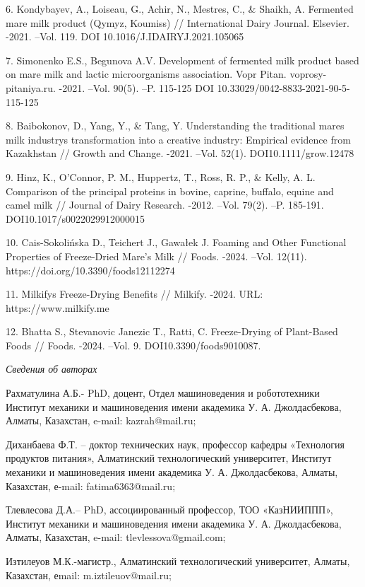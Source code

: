 6. Kondybayev, A., Loiseau, G., Achir, N., Mestres, C., \& Shaikh, A.
Fermented mare milk product (Qymyz, Koumiss) // International Dairy
Journal. Elsevier. -2021. --Vol. 119. DOI 10.1016/J.IDAIRYJ.2021.105065

7. Simonenko E.S., Begunova A.V. Development of fermented milk product
based on mare milk and lactic microorganisms association. Vopr Pitan.
voprosy-pitaniya.ru. -2021. --Vol. 90(5). --P. 115-125 DOI
10.33029/0042-8833-2021-90-5-115-125

8. Baibokonov, D., Yang, Y., \& Tang, Y. Understanding the traditional
mares\textquotesingle{} milk industry\textquotesingle s transformation
into a creative industry: Empirical evidence from Kazakhstan // Growth
and Change. -2021. --Vol. 52(1). DOI10.1111/grow.12478

9. Hinz, K., O'Connor, P. M., Huppertz, T., Ross, R. P., \& Kelly, A. L.
Comparison of the principal proteins in bovine, caprine, buffalo, equine
and camel milk // Journal of Dairy Research. -2012. --Vol. 79(2). --P.
185-191. DOI10.1017/s0022029912000015

10. Cais-Sokolińska D., Teichert J., Gawałek J. Foaming and Other
Functional Properties of Freeze-Dried Mare's Milk // Foods. -2024.
--Vol. 12(11). https://doi.org/10.3390/foods12112274

11. Milkify\textquotesingle s Freeze-Drying Benefits // Milkify. -2024.
URL: https://www.milkify.me

12. Bhatta S., Stevanovic Janezic T., Ratti, C. Freeze-Drying of
Plant-Based Foods // Foods. -2024. --Vol. 9. DOI10.3390/foods9010087.

\emph{Сведения об авторах}

Рахматулина А.Б.- PhD, доцент, Отдел машиноведения и робототехники
Институт механики и машиноведения имени академика У. А. Джолдасбекова,
Алматы, Казахстан, e-mail: kazrah@mail.ru;

Диханбаева Ф.Т. -- доктор технических наук, профессор кафедры
«Технология продуктов питания», Алматинский технологический университет,
Институт механики и машиноведения имени академика У. А. Джолдасбекова,
Алматы, Казахстан, е-mail: fatima6363@mail.ru;

Тлевлесова Д.А.-- PhD, ассоциированный профессор, ТОО «КазНИИППП»,
Институт механики и машиноведения имени академика У. А. Джолдасбекова,
Алматы, Казахстан, e-mail: tlevlessova@gmail.com;

Изтилеуов М.К.-магистр., Алматинский технологический университет,
Алматы, Казахстан, еmail: m.iztileuov@mail.ru;

